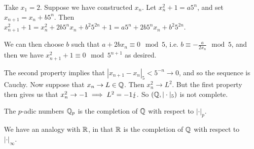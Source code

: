 \documentclass[10pt,a4paper]{article}
\begin{document}
Take $x_1 = 2$. Suppose we have constructed $x_n$. Let $x_n^2 + 1 = a5^n$, and set $x_{n+1} = x_n + b5^n$. Then $x_{n+1}^2 + 1=  x_n^2 + 2b5^nx_n + b^2 5^{2n} + 1 = a5^n + 2b5^nx_n + b^2 5^{2n}$.

We can then choose $b$ such that $a+2bx_n \equiv 0 \mod 5$, i.e. $b \equiv -\frac{a}{2x_n} \mod 5$, and then we have $x_{n+1}^2 +1 \equiv 0 \mod 5^{n+1}$ as desired.

The second property implies that $|x_{n+1} - x_n|_5 < 5^{-n} \to 0$, and so the sequence is Cauchy. Now suppose that $x_n \to L \in \mathbb{Q}$. Then $x_n^2 \to L^2$. But the first property then gives us that $x_n^2 \to -1 \implies L^2 = -1 \lightning.$ So $(\mathbb{Q}, |\cdot|_5)$ is not complete.

\begin{definition}
  The $p$-adic numbers $\mathbb{Q}_p$ is the completion of $\mathbb{Q}$ with respect to $|\cdot|_p$.
\end{definition}
We have an analogy with $\mathbb{R}$, in that $\mathbb{R}$ is the completion of $\mathbb{Q}$ with respect to $|\cdot|_\infty$.
\end{document}
